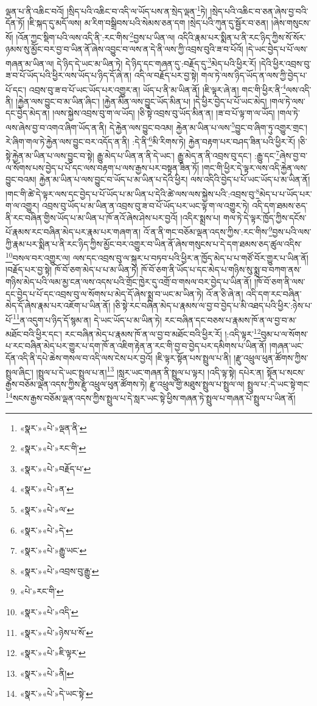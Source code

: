 ལྡན་པ་ནི་འཆིང་བའོ། །སྲིད་པའི་འཆིང་བ་འདི་ལ་ཡོད་པས་ན་སྲེད་ལྡན་\footnote{«སྣར་»«པེ་»ལྡན་ནི་}ཏེ། །སྲེད་པའི་འཆིང་བ་ཅན་ཞེས་བྱ་བའི་དོན་ཏོ། །ཇི་སྐད་དུ་མདོ་ལས། མ་རིག་བསྒྲིབས་པའི་སེམས་ཅན་དག །སྲེད་པའི་ཀུན་དུ་སྦྱོར་བ་ཅན། །ཞེས་གསུངས་སོ། །འོན་ཀྱང་སྡིག་པའི་ལས་འདི་ནི་:རང་གིས་\footnote{«སྣར་»«པེ་»རང་གི་}བྱས་པ་ཡིན་ལ། འདིའི་རྣམ་པར་སྨིན་པ་ནི་རང་ཉིད་ཀྱིས་སོ་སོར་ཉམས་སུ་མྱོང་བར་བྱ་བ་ཡིན་ནོ་ཞེས་འབྱུང་བ་ལས་ན་དེ་ནི་ལས་ཀྱི་འབྲས་བུའི་ཟ་བ་པོའོ། །དེ་ཡང་བྱེད་པ་པོ་ལས་གཞན་མ་ཡིན་ལ། དེ་ཉིད་དེ་ཡང་མ་ཡིན་ཏེ། དེ་ཉིད་དང་གཞན་དུ་:བརྗོད་དུ་\footnote{«སྣར་»«པེ་»བརྗོད་པ་}མེད་པའི་ཕྱིར་རོ། །དེའི་ཕྱིར་འབྲས་བུ་ཟ་བ་པོ་ཡོད་པའི་ཕྱིར་ལས་ཡོད་པ་ཉིད་དོ་ཞེ་ན། འདི་ལ་བརྗོད་པར་བྱ་སྟེ། གལ་ཏེ་ལས་ཉིད་ཡོད་ན་ལས་ཀྱི་བྱེད་པ་པོ་དང་། འབྲས་བུ་ཟ་བ་པོ་ཡང་ཡོད་པར་འགྱུར་ན། ཡོད་པ་ནི་མ་ཡིན་ནོ། །ཇི་ལྟར་ཞེ་ན། གང་གི་ཕྱིར་ནི་\footnote{«སྣར་»«པེ་»ན་}ལས་འདི་ནི། །རྐྱེན་ལས་བྱུང་བ་མ་ཡིན་ཞིང་། །རྐྱེན་མིན་ལས་བྱུང་ཡོད་མིན་པ། །དེ་ཕྱིར་བྱེད་པ་པོ་ཡང་མེད། །གལ་ཏེ་ལས་དང་བྱེད་མེད་ན། །ལས་སྐྱེས་འབྲས་བུ་ག་ལ་ཡོད། །ཅི་སྟེ་འབྲས་བུ་ཡོད་མིན་ན། །ཟ་བ་པོ་ལྟ་ག་ལ་ཡོད། །གལ་ཏེ་ལས་ཞེས་བྱ་བ་འགའ་ཞིག་ཡོད་ན་ནི། དེ་རྐྱེན་ལས་བྱུང་བའམ། རྐྱེན་མ་ཡིན་པ་ལས་\footnote{«སྣར་»«པེ་»ལ་}བྱུང་བ་ཞིག་ཏུ་འགྱུར་གྲང་། རེ་ཞིག་གལ་ཏེ་རྐྱེན་ལས་བྱུང་བར་འདོད་ན་ནི། :དེ་ནི་\footnote{«སྣར་»«པེ་»དེ་}མི་རིགས་ཏེ། རྐྱེན་བརྟག་པར་བཤད་ཟིན་པའི་ཕྱིར་རོ། །ཅི་སྟེ་རྐྱེན་མ་ཡིན་པ་ལས་བྱུང་བ་སྟེ། རྒྱུ་མེད་པ་ཡིན་ན་ནི་དེ་ཡང་། རྒྱུ་མེད་ན་ནི་འབྲས་བུ་དང་། :རྒྱུ་དང་\footnote{«སྣར་»«པེ་»རྒྱུ་ཡང་}ཞེས་བྱ་བ་ལ་སོགས་པས་བྱེད་པ་པོ་དང་ལས་བརྟག་པ་ལས་རྒྱས་པར་བསྟན་ཟིན་ཏོ། །གང་གི་ཕྱིར་དེ་ལྟར་ལས་འདི་རྐྱེན་ལས་བྱུང་བའམ། རྐྱེན་མ་ཡིན་པ་ལས་བྱུང་བ་ཡོད་པ་མ་ཡིན་པ་དེའི་ཕྱིར། ལས་འདིའི་བྱེད་པ་པོ་ཡང་ཡོད་པ་མ་ཡིན་ནོ། །གང་གི་ཚེ་དེ་ལྟར་ལས་དང་བྱེད་པ་པོ་ཡོད་པ་མ་ཡིན་པ་དེའི་ཚེ་ལས་ལས་སྐྱེས་པའི་:འབྲས་བུ་\footnote{«སྣར་»«པེ་»འབྲས་བུ་རྒྱུ་}མེད་པ་པ་ཡོད་པར་ག་ལ་འགྱུར། འབྲས་བུ་ཡོད་པ་མ་ཡིན་ན་འབྲས་བུ་ཟ་བ་པོ་ཡོད་པར་ཡང་ལྟ་ག་ལ་འགྱུར་ཏེ། འདི་དག་ཐམས་ཅད་ནི་རང་བཞིན་གྱིས་ཡོད་པ་མ་ཡིན་པ་ཁོ་ནའོ་ཞེས་ཤེས་པར་བྱའོ། །འདིར་སྨྲས་པ། གལ་ཏེ་དེ་ལྟར་ཁྱོད་ཀྱིས་དངོས་པོ་རྣམས་རང་བཞིན་མེད་པར་རྣམ་པར་གཞག་ན། འོ་ན་ནི་གང་བཅོམ་ལྡན་འདས་ཀྱིས་:རང་གིས་\footnote{«པེ་»རང་གི་}བྱས་པའི་ལས་ཀྱི་རྣམ་པར་སྨིན་པ་ནི་རང་ཉིད་ཀྱིས་མྱོང་བར་འགྱུར་བ་ཡིན་ནོ་ཞེས་གསུངས་པ་དེ་དག་ཐམས་ཅད་ཚུལ་འདིས་\footnote{«སྣར་»«པེ་»འདི་}བསལ་བར་འགྱུར་ལ། ལས་དང་འབྲས་བུ་ལ་སྐུར་པ་བཏབ་པའི་ཕྱིར་ན་ཁྱོད་མེད་པ་པ་གཙོ་བོར་གྱུར་པ་ཡིན་ནོ། །བརྗོད་པར་བྱ་སྟེ། ཁོ་བོ་ཅག་མེད་པ་པ་མ་ཡིན་ཏེ། ཁོ་བོ་ཅག་ནི་ཡོད་པ་དང་མེད་པ་གཉིས་སུ་སྨྲ་བ་བཀག་ནས་གཉིས་མེད་པའི་ལམ་མྱ་ངན་ལས་འདས་པའི་གྲོང་ཁྱེར་དུ་འགྲོ་བ་གསལ་བར་བྱེད་པ་ཡིན་ནོ། །ཁོ་བོ་ཅག་ནི་ལས་དང་བྱེད་པ་པོ་དང་འབྲས་བུ་ལ་སོགས་པ་མེད་དོ་ཞེས་སྨྲ་བ་ཡང་མ་ཡིན་ཏེ། འོ་ན་ཅི་ཞེ་ན། འདི་དག་རང་བཞིན་མེད་དོ་ཞེས་རྣམ་པར་འཇོག་པ་ཡིན་ནོ། །ཅི་སྟེ་རང་བཞིན་མེད་པ་རྣམས་ལ་བྱ་བ་བྱེད་པ་མི་འཐད་པའི་ཕྱིར་:ཉེས་པ་པོ་\footnote{«སྣར་»«པེ་»ཉེས་པ་སོ་}ན་འདུག་པ་ཉིད་དོ་སྙམ་ན། དེ་ཡང་ཡོད་པ་མ་ཡིན་ཏེ། རང་བཞིན་དང་བཅས་པ་རྣམས་ཁོ་ན་ལ་བྱ་བ་མ་མཐོང་བའི་ཕྱིར་དང་། རང་བཞིན་མེད་པ་རྣམས་ཁོ་ན་ལ་བྱ་བ་མཐོང་བའི་ཕྱིར་རོ། །:འདི་ལྟར་\footnote{«སྣར་»«པེ་»ཇི་ལྟར་}བུམ་པ་ལ་སོགས་པ་རང་བཞིན་མེད་པར་གྱུར་པ་དག་ཁོ་ན་འཇིག་རྟེན་ན་རང་གི་བྱ་བ་བྱེད་པར་དམིགས་པ་ཡིན་ནོ། །གཞན་ཡང་དོན་འདི་ནི་དཔེ་ཆེས་གསལ་བ་འདི་ལས་ངེས་པར་བྱའོ། །ཇི་ལྟར་སྟོན་པས་སྤྲུལ་པ་ནི། །རྫུ་འཕྲུལ་ཕུན་ཚོགས་ཀྱིས་སྤྲུལ་ཞིང་། །སྤྲུལ་པ་དེ་ཡང་སྤྲུལ་པ་ན།\footnote{«སྣར་»«པེ་»ནི།} །སླར་ཡང་གཞན་ནི་སྤྲུལ་པ་ལྟར། །འདི་ལྟ་སྟེ། དཔེར་ན། སྟོན་པ་སངས་རྒྱས་བཅོམ་ལྡན་འདས་ཀྱིས་རྫུ་འཕྲུལ་ཕུན་ཚོགས་ཏེ། རྫུ་འཕྲུལ་གྱི་མཐུས་སྤྲུལ་པ་སྤྲུལ་ལ། སྤྲུལ་པ་:དེ་ཡང་སྟེ་གང་\footnote{«སྣར་»«པེ་»དེ་ཡང་སྟེ་}སངས་རྒྱས་བཅོམ་ལྡན་འདས་ཀྱིས་སྤྲུལ་པ་དེ་སླར་ཡང་སྟེ་ཕྱིས་གཞན་ཏེ་སྤྲུལ་པ་གཞན་པོ་སྤྲུལ་པ་ཡིན་ནོ། 